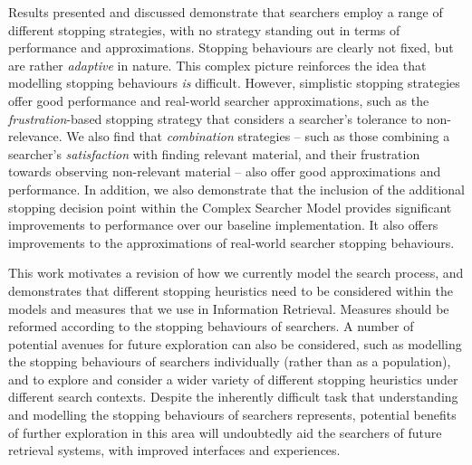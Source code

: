 \begin{preamble}
Results presented and discussed demonstrate that searchers employ a range of different stopping strategies, with no strategy standing out in terms of performance and approximations. Stopping behaviours are clearly not fixed, but are rather \emph{adaptive} in nature. This complex picture reinforces the idea that modelling stopping behaviours \emph{is} difficult. However, simplistic stopping strategies offer good performance and real-world searcher approximations, such as the \emph{frustration}-based stopping strategy that considers a searcher's tolerance to non-relevance. We also find that \emph{combination} strategies -- such as those combining a searcher's \emph{satisfaction} with finding relevant material, and their frustration towards observing non-relevant material -- also offer good approximations and performance. In addition, we also demonstrate that the inclusion of the additional stopping decision point within the Complex Searcher Model provides significant improvements to performance over our baseline implementation. It also offers improvements to the approximations of real-world searcher stopping behaviours.

This work motivates a revision of how we currently model the search process, and demonstrates that different stopping heuristics need to be considered within the models and measures that we use in Information Retrieval. Measures should be reformed according to the stopping behaviours of searchers. A number of potential avenues for future exploration can also be considered, such as modelling the stopping behaviours of searchers individually (rather than as a population), and to explore and consider a wider variety of different stopping heuristics under different search contexts. Despite the inherently difficult task that understanding and modelling the stopping behaviours of searchers represents, potential benefits of further exploration in this area will undoubtedly aid the searchers of future retrieval systems, with improved interfaces and experiences.

\end{preamble}